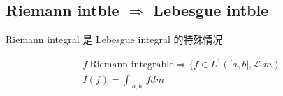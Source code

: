 \documentclass{qlnotes-export}
\begin{document}
\subsection{\texorpdfstring{Riemann intble \(\Longrightarrow\) Lebesgue intble}{Riemann intble \textbackslash Longrightarrow Lebesgue intble}}\label{riemann-intble-longrightarrow-lebesgue-intble}

\begin{theorem}{Riemann integral 是 Lebesgue integral 的特殊情况}\label{thm-05-integration-of-real-and-complex-functions-riemann-integral-lebesgue-integral}

\[\begin{matrix}
{f\ \text{Riemann integrable}\Longrightarrow\{ f \in L^{1}(\lbrack a,b\rbrack,\mathcal{L}.m)} \\
{I(f) = \int_{\lbrack a,b\rbrack}f dm}
\end{matrix}\]

\end{theorem}
\end{document}
